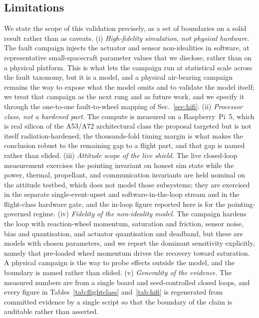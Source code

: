 \documentclass[journal]{IEEEtran}
\begin{document}
\subsection{Limitations}
\label{sec:limitations}
We state the scope of this validation precisely, as a set of boundaries on a solid result rather
than as caveats. (i) \emph{High-fidelity simulation, not physical hardware.} The fault campaign
injects the actuator and sensor non-idealities in software, at representative small-spacecraft
parameter values that we disclose, rather than on a physical platform. This is what lets the
campaign run at statistical scale across the fault taxonomy, but it is a model, and a physical
air-bearing campaign remains the way to expose what the model omits and to validate the model
itself; we treat that campaign as the next rung and as future work, and we specify it through the
one-to-one fault-to-wheel mapping of Sec.~\ref{sec:hifi}. (ii) \emph{Processor class,
not a hardened part.} The compute is measured on a Raspberry~Pi~5, which is real silicon of the
A53/A72 architectural class the proposal targeted but is not itself radiation-hardened; the
thousands-fold timing margin is what makes the conclusion robust to the remaining gap to a flight
part, and that gap is named rather than elided. (iii) \emph{Attitude scope of the live shield.}
The live closed-loop measurement exercises the pointing invariant on honest sim state while the
power, thermal, propellant, and communication invariants are held nominal on the attitude testbed,
which does not model those subsystems; they are exercised in the separate single-event-upset and
software-in-the-loop stream and in the flight-class hardware gate, and the in-loop figure reported
here is for the pointing-governed regime. (iv) \emph{Fidelity of the non-ideality model.} The
campaign hardens the loop with reaction-wheel momentum, saturation and friction, sensor noise, bias
and quantisation, and actuator quantisation and deadband, but these are models with chosen
parameters, and we report the dominant sensitivity explicitly, namely that pre-loaded wheel
momentum drives the recovery toward saturation. A physical campaign is the way to probe effects
outside the model, and the boundary is named rather than elided. (v) \emph{Generality of the
evidence.} The measured numbers are from a single board and seed-controlled closed loops, and every
figure in Tables~\ref{tab:flightclass} and~\ref{tab:hifi} is regenerated from committed evidence by
a single script so that the boundary of the claim is auditable rather than asserted.
\end{document}
